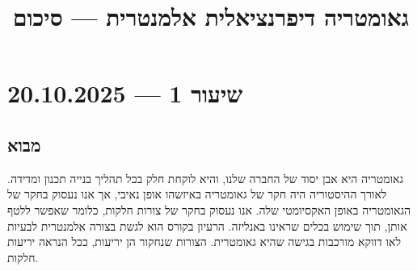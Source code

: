 
\title{גאומטריה דיפרנציאלית אלמנטרית --- סיכום}
\setcounter{secnumdepth}{2}

\usepackage{fancyhdr}
\pagestyle{fancy}
\renewcommand{\headrulewidth}{0pt}


\maketitle
\maketitleprint[purple]

\tableofcontents

\section{שיעור 1 --- 20.10.2025}
\subsection{מבוא}
גאומטריה היא אבן יסוד של החברה שלנו, והיא לוקחת חלק בכל תהליך בנייה תכנון ומדידה.
לאורך ההיסטוריה היה חקר של גאומטריה באיזשהו אופן נאיבי, אך אנו נעסוק בחקר של הגאומטריה באופן האקסיומטי שלה.
אנו נעסוק בחקר של צורות חלקות, כלומר שאפשר ללטף אותן, תוך שימוש בכלים שראינו באנליזה.
הרעיון בקורס הוא לגשת בצורה אלמנטרית לבעיות לאו דווקא מורכבות בגישה שהיא גאומטרית.
הצורות שנחקור הן יריעות, ככל הנראה יריעות חלקות.

